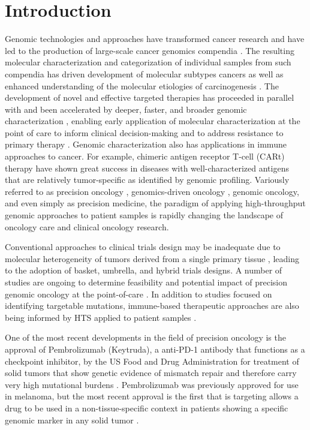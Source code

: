 \documentclass{article}
\begin{document}
\section{Introduction}
Genomic technologies and approaches have transformed cancer research
and have led to the production of large-scale cancer genomics
compendia
\cite{noauthor_undated-vx,Cancer_Genome_Atlas_Research_Network2013-gt}. The
resulting molecular characterization and categorization of individual
samples from such compendia has driven development of molecular
subtypes cancers as well as enhanced understanding of the molecular
etiologies of carcinogenesis
\cite{Cancer_Genome_Atlas_Network2012-nz,Cancer_Genome_Atlas_Research_Network2015-gd,noauthor_2008-wg}. The
development of novel and effective targeted therapies has proceeded in
parallel with and been accelerated by deeper, faster, and broader
genomic characterization \cite{Blumenthal2016-fb}, enabling early
application of molecular characterization at the point of care to
inform clinical decision-making
\cite{Flaherty2012-dq,Shaw2013-wl,Maemondo2010-dj,Druker2006-qk} and
to address resistance to primary therapy \cite{Ai2014-nf}. Genomic
characterization also has applications in immune approaches to
cancer. For example, chimeric antigen receptor T-cell (CARt) therapy
have shown great success in diseases with well-characterized antigens
that are relatively tumor-specific \cite{Grupp2013-nd} as identified
by genomic profiling. Variously referred to as precision oncology
\cite{Sohal2015-bi}, genomics-driven oncology \cite{Garraway2013-zo},
genomic oncology, and even simply as precision medicine, the paradigm
of applying high-throughput genomic approaches to patient samples is
rapidly changing the landscape of oncology care and clinical oncology
research.

Conventional approaches to clinical trials design may be inadequate
due to molecular heterogeneity of tumors derived from a single primary
tissue \cite{Simon2016-ik}, leading to the adoption of basket,
umbrella, and hybrid trials designs. A number of studies are ongoing
to determine feasibility and potential impact of precision genomic
oncology at the point-of-care
\cite{Cheng2015-wh,noauthor_undated-da,Lopez-Chavez2015-cg}. In
addition to studies focused on identifying targetable mutations,
immune-based therapeutic approaches are also being informed by HTS
applied to patient samples
\cite{Bethune2017-ns,Chalmers2017-ya,Faltas2016-yz}.

One of the most recent developments in the field of precision oncology
is the approval of Pembrolizumab (Keytruda), a anti-PD-1 antibody that
functions as a checkpoint inhibitor, by the US Food and Drug
Administration for treatment of solid tumors that show genetic
evidence of mismatch repair and therefore carry very high mutational
burdens \cite{Le2017-vc}. Pembrolizumab was previously approved for use in
melanoma, but the most recent approval is the first that is targeting
allows a drug to be used in a non-tissue-specific context in patients
showing a specific genomic marker in any solid tumor
\cite{Garber2017-sk}. 
\end{document}
